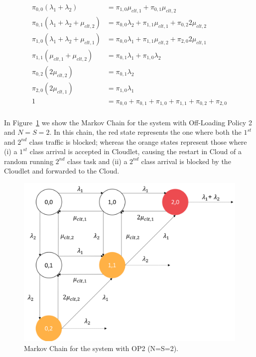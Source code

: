 \begin{equation}
	\begin{split}
		\pi_{0,0}(\lambda_{1}+\lambda_{2})& = \pi_{1,0}\mu_{clt,1}+\pi_{0,1}\mu_{clt,2} \\
		\pi_{0,1}(\lambda_{1}+\lambda_{2}+\mu_{clt,2}) & = \pi_{0,0}\lambda_{2}+\pi_{1,1}\mu_{clt,1}+\pi_{0,2}2\mu_{clt,2} \\
		\pi_{1,0}(\lambda_{1}+\lambda_{2}+\mu_{clt,1}) & = \pi_{0,0}\lambda_{1}+\pi_{1,1}\mu_{clt,2}+\pi_{2,0}2\mu_{clt,1} \\
		\pi_{1,1}(\mu_{clt,1}+\mu_{clt,2}) & = \pi_{0,1}\lambda_{1}+\pi_{1,0}\lambda_{2} \\
		\pi_{0,2}(2\mu_{clt,2}) & = \pi_{0,1}\lambda_{2} \\
		\pi_{2,0}(2\mu_{clt,1}) & = \pi_{1,0}\lambda_{1} \\
		1 & = \pi_{0,0}+\pi_{0,1}+\pi_{1,0}+\pi_{1,1}+\pi_{0,2}+\pi_{2,0}\\
	\end{split}
	\label{eqn:analytical-model-markov-1}
\end{equation}

In Figure~\ref{fig:analytical-model-markov-2} we show the Markov Chain for the system with Off-Loading Policy 2 and $N=S=2$. 
In this chain, the red state represents the one where both the $1^{st}$ and $2^{nd}$ class traffic is blocked; whereas the orange states represent those where (i) a $1^{st}$ class arrival is accepted in Cloudlet, causing the restart in Cloud of a random running $2^{nd}$ class task and (ii) a $2^{nd}$ class arrival is blocked by the Cloudlet and forwarded to the Cloud.

\begin{figure}
	\includegraphics[width=\columnwidth]{fig/analytical-model-markov-2}
	\caption{Markov Chain for the system with OP2 (N=S=2).}
	\label{fig:analytical-model-markov-2}
\end{figure}

